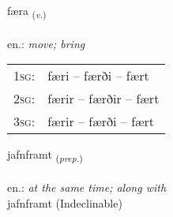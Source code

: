 \documentclass[frontgrid, backgrid]{flacards}\usepackage[]{graphicx}\usepackage[]{xcolor}
\begin{document}
\renewcommand{\blhead}{\vskip5pt {\small\bfseries\footnotesize Sagnorð | Verb }}
\renewcommand{\bcfoot}{\vskip5pt \hspace{2pt}{\small\bfseries\footnotesize 1K}}


{færa \small{\textsubscript{(\textit{v.})}} \\[1ex] %
\textphonetic{[faiːra]} \\
en.: \emph{move; bring} \\  [2ex]
\renewcommand*{\arraystretch}{0.8}
\begin{tabular}{p{1cm}l}
\textsc{1sg}: & færi -- færði -- fært \\ 
\textsc{2sg}: & færir -- færðir -- fært \\ 
\textsc{3sg}: & færir -- færði -- fært \\ 
\end{tabular}
}


\renewcommand{\flhead}{\vskip5pt \fboxsep=0pt {\small\bfseries\footnotesize Forsetning | Preposition}}
\renewcommand{\fcfoot}{\vskip5pt \fboxsep=0pt \hspace{2pt}{\small\bfseries\footnotesize 1K}}

\renewcommand{\blhead}{\vskip5pt {\small\bfseries\footnotesize Forsetning | Preposition }}
\renewcommand{\bcfoot}{\vskip5pt \hspace{2pt}{\small\bfseries\footnotesize 1K}}


{jafnframt \small{\textsubscript{(\textit{prep.})}} \\[1ex]
 \\
en.: \emph{at the same time; along with} \\  [2ex]
jafnframt (Indeclinable)}


\renewcommand{\flhead}{\vskip5pt \fboxsep=0pt {\small\bfseries\footnotesize Forsetning | Preposition}}
\renewcommand{\fcfoot}{\vskip5pt \fboxsep=0pt \hspace{2pt}{\small\bfseries\footnotesize 1K}}
\end{document}
